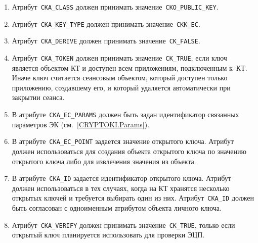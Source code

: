 \begin{enumerate}
\item
Атрибут~\verb|CKA_CLASS| должен принимать значение~\verb|CKO_PUBLIC_KEY|.

\item
Атрибут~\verb|CKA_KEY_TYPE| должен принимать значение~\verb|CKK_EC|.

\item
Атрибут~\verb|CKA_DERIVE| должен принимать значение~\verb|CK_FALSE|.

\item
Атрибут~\verb|CKA_TOKEN| должен принимать значение~\verb|CK_TRUE|,
если ключ является объектом КТ и доступен всем приложениям, подключенным 
к~КТ.  
%
Иначе ключ считается сеансовым объектом, который доступен только
приложению, создавшему его, и который удаляется автоматически при закрытии сеанса.
%

\item
В атрибуте~\verb|CKA_EC_PARAMS| должен быть задан идентификатор связанных 
параметров ЭК (см.~\ref{CRYPTOKI.Params}).

\item
В атрибуте~\verb|CKA_EC_POINT| задается значение открытого ключа. 
Атрибут должен использоваться для создания объекта открытого ключа 
по значению открытого ключа либо для извлечения значения из объекта. 

\item
В атрибуте~\verb|CKA_ID| задается идентификатор открытого ключа. 
Атрибут должен использоваться в тех случаях, когда на КТ  
хранятся несколько открытых ключей и требуется выбирать один из них. 
%
Атрибут~\verb|CKA_ID| должен быть согласован с одноименным атрибутом 
объекта личного ключа.

\item
Атрибут~\verb|CKA_VERIFY| должен принимать значение~\verb|CK_TRUE|, 
только если открытый ключ планируется использовать для проверки ЭЦП.


\end{enumerate}
